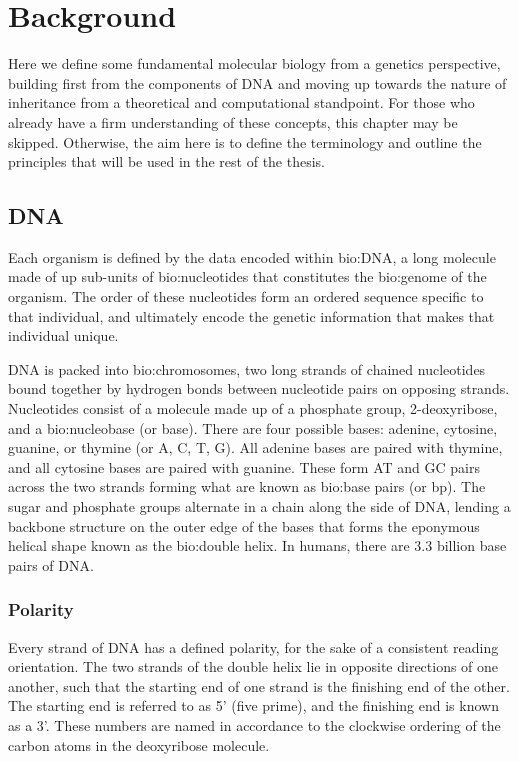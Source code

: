 

\chapter{Background}

Here we define some fundamental molecular biology from a genetics perspective, building first from the components of DNA and moving up towards the nature of inheritance from a theoretical and computational standpoint. For those who already have a firm understanding of these concepts, this chapter may be skipped. Otherwise, the aim here is to define the terminology and outline the principles that will be used in the rest of the thesis.

\section{DNA}

Each organism is defined by the data encoded within \gls{bio:DNA}, a long molecule made of up sub-units of \gls{bio:nucleotides} that constitutes the \gls{bio:genome} of the organism. The order of these nucleotides form an ordered sequence specific to that individual, and ultimately encode the genetic information that makes that individual unique.

DNA is packed into \gls{bio:chromosomes}, two long strands of chained nucleotides bound together by hydrogen bonds between nucleotide pairs on opposing strands. Nucleotides consist of a molecule made up of a phosphate group, 2-deoxyribose, and a \gls{bio:nucleobase} (or base). There are four possible bases: adenine, cytosine, guanine, or thymine (or A, C, T, G).  All adenine bases are paired with thymine, and all cytosine bases are paired with guanine. 
These form AT and GC pairs across the two strands forming what are known as \gls{bio:base pairs} (or bp).
The sugar and phosphate groups alternate in a chain along the side of DNA, lending a backbone structure on the outer edge of the bases that forms the eponymous helical shape known as the \gls{bio:double helix}.  In humans, there are 3.3 billion base pairs of DNA.


\subsection{Polarity}

Every strand of DNA has a defined polarity, for the sake of a consistent reading orientation. The two strands of the double helix lie in opposite directions of one another, such that the starting end of one strand is the finishing end of the other.
The starting end is referred to as 5' (five prime), and the finishing end is known as a 3'. These numbers are named in accordance to the clockwise ordering of the carbon atoms in the deoxyribose molecule. 

